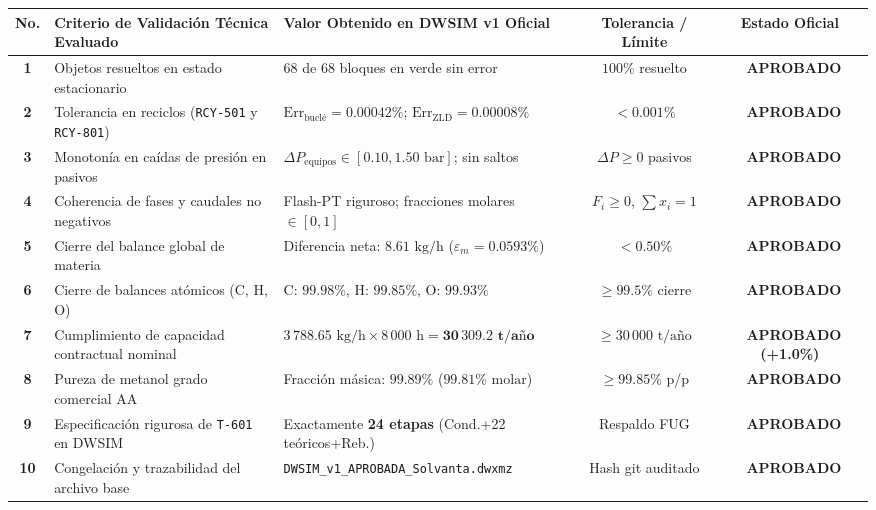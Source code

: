 \documentclass[10pt,landscape]{article}
\newcommand{\badgegreen}[1]{\colorbox{badgegreen}{\textbf{\color{emeraldgreen}\fontsize{6.8pt}{8pt}\selectfont #1}}}
\begin{document}
\scriptsize
\renewcommand{\arraystretch}{1.18}
\begin{tabularx}{\textwidth}{c p{5.0cm} p{4.6cm} c c}
  \toprule
  \rowcolor{tableheader}
  \textbf{\color{white}No.} & \textbf{\color{white}Criterio de Validación Técnica Evaluado} & \textbf{\color{white}Valor Obtenido en DWSIM v1 Oficial} & \textbf{\color{white}Tolerancia / Límite} & \textbf{\color{white}Estado Oficial} \\
  \midrule
  \rowcolor{roweven}
  \textbf{1} & Objetos resueltos en estado estacionario & 68 de 68 bloques en verde sin error & $100\%$ resuelto & \badgegreen{\checkmark\ APROBADO} \\
  \rowcolor{rowodd}
  \textbf{2} & Tolerancia en reciclos (\texttt{RCY-501} y \texttt{RCY-801}) & $\text{Err}_{\text{buclé}} = 0.00042\%$; $\text{Err}_{\text{ZLD}} = 0.00008\%$ & $< 0.001\%$ & \badgegreen{\checkmark\ APROBADO} \\
  \rowcolor{roweven}
  \textbf{3} & Monotonía en caídas de presión en pasivos & $\Delta P_{\text{equipos}} \in [0.10, 1.50\text{ bar}]$; sin saltos & $\Delta P \ge 0$ pasivos & \badgegreen{\checkmark\ APROBADO} \\
  \rowcolor{rowodd}
  \textbf{4} & Coherencia de fases y caudales no negativos & Flash-PT riguroso; fracciones molares $\in [0, 1]$ & $F_i \ge 0$, $\sum x_i = 1$ & \badgegreen{\checkmark\ APROBADO} \\
  \rowcolor{roweven}
  \textbf{5} & Cierre del balance global de materia & Diferencia neta: $8.61\text{ kg/h}$ ($\varepsilon_m = \mathbf{0.0593\%}$) & $< 0.50\%$ & \badgegreen{\checkmark\ APROBADO} \\
  \rowcolor{rowodd}
  \textbf{6} & Cierre de balances atómicos (C, H, O) & C: $99.98\%$, H: $99.85\%$, O: $99.93\%$ & $\ge 99.5\%$ cierre & \badgegreen{\checkmark\ APROBADO} \\
  \rowcolor{roweven}
  \textbf{7} & Cumplimiento de capacidad contractual nominal & $3\,788.65\text{ kg/h} \times 8\,000\text{ h} = \mathbf{30\,309.2\text{ t/año}}$ & $\ge 30\,000\text{ t/año}$ & \badgegreen{\checkmark\ APROBADO (+1.0\%)} \\
  \rowcolor{rowodd}
  \textbf{8} & Pureza de metanol grado comercial AA & Fracción másica: $\mathbf{99.89\%}$ ($99.81\%\text{ molar}$) & $\ge 99.85\%$ p/p & \badgegreen{\checkmark\ APROBADO} \\
  \rowcolor{roweven}
  \textbf{9} & Especificación rigurosa de \texttt{T-601} en DWSIM & Exactamente \textbf{24 etapas} (Cond.+22 teóricos+Reb.) & Respaldo FUG & \badgegreen{\checkmark\ APROBADO} \\
  \rowcolor{rowodd}
  \textbf{10} & Congelación y trazabilidad del archivo base & \texttt{DWSIM\_v1\_APROBADA\_Solvanta.dwxmz} & Hash git auditado & \badgegreen{\checkmark\ APROBADO} \\
  \bottomrule
\end{tabularx}
\end{document}
